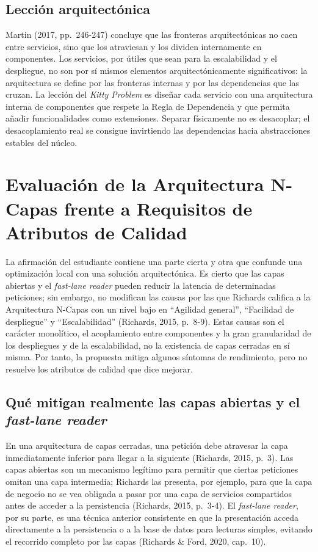 \documentclass[12pt,a4paper]{article}
\begin{document}
\subsection{Lección arquitectónica}

Martin (2017, pp.~246-247) concluye que las fronteras arquitectónicas no caen entre servicios, sino que los atraviesan y los dividen internamente en componentes. Los servicios, por útiles que sean para la escalabilidad y el despliegue, no son por sí mismos elementos arquitectónicamente significativos: la arquitectura se define por las fronteras internas y por las dependencias que las cruzan. La lección del \emph{Kitty Problem} es diseñar cada servicio con una arquitectura interna de componentes que respete la Regla de Dependencia y que permita añadir funcionalidades como extensiones. Separar físicamente no es desacoplar; el desacoplamiento real se consigue invirtiendo las dependencias hacia abstracciones estables del núcleo.

\section{Evaluación de la Arquitectura N-Capas frente a Requisitos de Atributos de Calidad}

La afirmación del estudiante contiene una parte cierta y otra que confunde una optimización local con una solución arquitectónica. Es cierto que las capas abiertas y el \emph{fast-lane reader} pueden reducir la latencia de determinadas peticiones; sin embargo, no modifican las causas por las que Richards califica a la Arquitectura N-Capas con un nivel bajo en ``Agilidad general'', ``Facilidad de despliegue'' y ``Escalabilidad'' (Richards, 2015, p.~8-9). Estas causas son el carácter monolítico, el acoplamiento entre componentes y la gran granularidad de los despliegues y de la escalabilidad, no la existencia de capas cerradas en sí misma. Por tanto, la propuesta mitiga algunos síntomas de rendimiento, pero no resuelve los atributos de calidad que dice mejorar.

\subsection{Qué mitigan realmente las capas abiertas y el \emph{fast-lane reader}}

En una arquitectura de capas cerradas, una petición debe atravesar la capa inmediatamente inferior para llegar a la siguiente (Richards, 2015, p.~3). Las capas abiertas son un mecanismo legítimo para permitir que ciertas peticiones omitan una capa intermedia; Richards las presenta, por ejemplo, para que la capa de negocio no se vea obligada a pasar por una capa de servicios compartidos antes de acceder a la persistencia (Richards, 2015, p.~3-4). El \emph{fast-lane reader}, por su parte, es una técnica anterior consistente en que la presentación acceda directamente a la persistencia o a la base de datos para lecturas simples, evitando el recorrido completo por las capas (Richards \& Ford, 2020, cap.~10).
\end{document}
